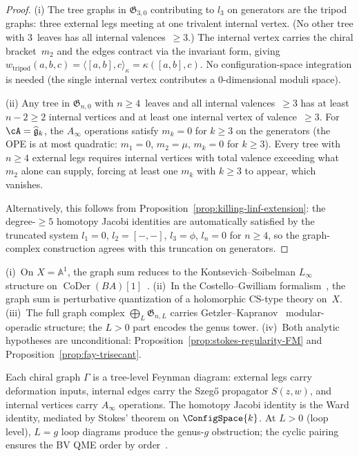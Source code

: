 \begin{proof}
(i)\enspace
The tree graphs in $\mathfrak{G}_{3,0}$ contributing to $l_3$ on
generators are the tripod graphs: three external legs
meeting at one trivalent internal vertex. (No other tree with
$3$~leaves has all internal valences~$\geq 3$.)
The internal vertex carries the chiral bracket~$m_2$ and the
edges contract via the invariant form, giving
$w_{\text{tripod}}(a,b,c) = \langle [a,b], c \rangle_\kappa
= \kappa([a,b],c)$.
No configuration-space integration is needed (the single internal
vertex contributes a $0$-dimensional moduli space).

(ii)\enspace
Any tree in $\mathfrak{G}_{n,0}$ with $n \geq 4$~leaves
and all internal valences~$\geq 3$ has at least $n - 2 \geq 2$
internal vertices and at least one internal vertex of
valence~$\geq 3$. For
$\cA = \widehat{\mathfrak{g}}_k$, the $A_\infty$ operations
satisfy $m_k = 0$ for $k \geq 3$ on the generators (the OPE is at
most quadratic: $m_1 = 0$, $m_2 = \mu$, $m_k = 0$ for
$k \geq 3$). Every tree with $n \geq 4$ external legs requires
internal vertices with total valence exceeding what $m_2$ alone can
supply, forcing at least one $m_k$ with $k \geq 3$ to appear, which
vanishes.

Alternatively, this follows from
Proposition~\ref{prop:killing-linf-extension}: the degree-$\geq 5$
homotopy Jacobi identities are automatically satisfied by the
truncated system $l_1 = 0$, $l_2 = [-,-]$, $l_3 = \phi$,
$l_n = 0$ for $n \geq 4$, so the graph-complex construction
agrees with this truncation on generators.
\end{proof}

\begin{remark}
\label{rem:graph-complex-context}
(i)~On $X = \mathbb{A}^1$, the graph sum reduces to the
Kontsevich--Soibelman $L_\infty$ structure on
$\operatorname{CoDer}(BA)[1]$~\cite{KontsevichSoibelman}.
(ii)~In the Costello--Gwilliam formalism~\cite{CG17,CG-vol2}, the
graph sum is perturbative quantization of a holomorphic CS-type
theory on~$X$.
(iii)~The full graph complex
$\bigoplus_L \mathfrak{G}_{n,L}$ carries
Getzler--Kapranov~\cite{GeK98} modular-operadic structure; the
$L > 0$ part encodes the genus tower.
(iv)~Both analytic hypotheses are unconditional:
Proposition~\ref{prop:stokes-regularity-FM} and
Proposition~\ref{prop:fay-trisecant}.
\end{remark}

\begin{remark}\label{rem:graph-complex-physics}
Each chiral graph $\Gamma$ is a tree-level Feynman diagram: external
legs carry deformation inputs, internal edges carry the Szeg\H{o}
propagator $S(z,w)$, and internal vertices carry $A_\infty$
operations. The homotopy Jacobi identity is the Ward identity,
mediated by Stokes' theorem on $\ConfigSpace{k}$. At
$L > 0$ (loop level), $L = g$
loop diagrams produce the genus-$g$ obstruction; the cyclic pairing ensures the BV QME order by
order~\cite{costello-renormalization}.
\end{remark}

